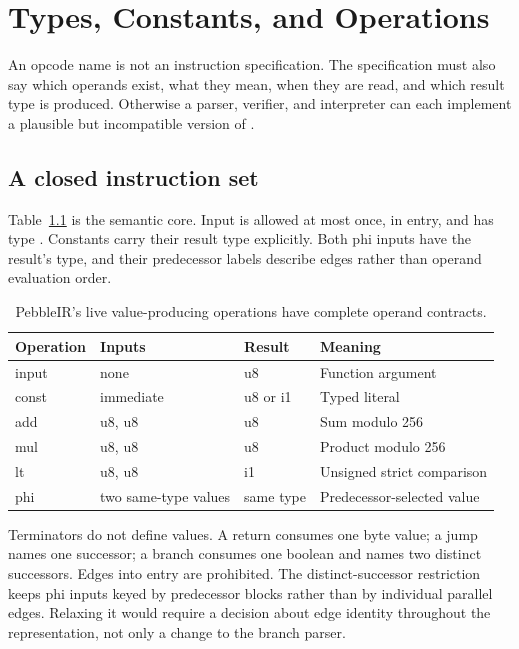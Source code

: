 \chapter{Types, Constants, and Operations}
\label{ch:pebble-operations}

An opcode name is not an instruction specification.
The specification must also say which operands exist, what they mean, when they are read, and which result type is produced.
Otherwise a parser, verifier, and interpreter can each implement a plausible but incompatible version of .

\section{A closed instruction set}
\label{sec:pebble-op-table}
Table~\ref{tab:pebble-ops} is the semantic core.
Input is allowed at most once, in entry, and has type .
Constants carry their result type explicitly.
Both phi inputs have the result's type, and their predecessor labels describe edges rather than operand evaluation order.

\begin{table}[htbp]
\caption{PebbleIR's live value-producing operations have complete operand contracts.}
\label{tab:pebble-ops}
\centering
\begin{tabular}{llll}
\toprule
Operation & Inputs & Result & Meaning \\
\midrule
input & none & u8 & Function argument \\
const & immediate & u8 or i1 & Typed literal \\
add & u8, u8 & u8 & Sum modulo 256 \\
mul & u8, u8 & u8 & Product modulo 256 \\
lt & u8, u8 & i1 & Unsigned strict comparison \\
phi & two same-type values & same type & Predecessor-selected value \\
\bottomrule
\end{tabular}
\end{table}

Terminators do not define values.
A return consumes one byte value; a jump names one successor; a branch consumes one boolean and names two distinct successors.
Edges into entry are prohibited.
The distinct-successor restriction keeps phi inputs keyed by predecessor blocks rather than by individual parallel edges.
Relaxing it would require a decision about edge identity throughout the representation, not only a change to the branch parser.


